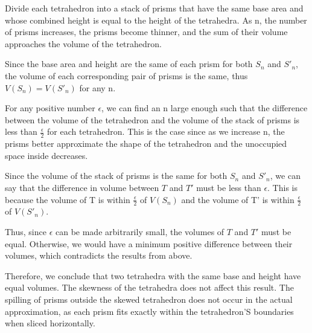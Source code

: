 \documentclass{article}
\begin{document}
Divide each tetrahedron into a stack of prisms that have the same base area
and whose combined height is equal to the height of the tetrahedra.
As n, the number of prisms increases, the prisms become thinner, and the sum
of their volume approaches the volume of the tetrahedron.

Since the base area and height are the same of each prism for both $S_n$
and ${S'}_n$, the volume of each corresponding pair of prisms is the same,
thus $V(S_n) = V({S'}_n)$ for any n.

For any positive number $\epsilon$, we can find an n large enough such that
the difference between the volume of the tetrahedron and the volume of the stack
of prisms is less than $\frac{\epsilon}{2}$ for each tetrahedron. This is the case
since as we increase n, the prisms better approximate the shape of the tetrahedron
and the unoccupied space inside decreases.

Since the volume of the stack of prisms is the same for both $S_n$ and ${S'}_n$,
we can say that the difference in volume between $T$ and $T'$ must be less than
$\epsilon$. This is because the volume of T is within $\frac{\epsilon}{2}$
of $V(S_n)$ and the volume of T' is within $\frac{\epsilon}{2}$ of $V({S'}_n)$.

Thus, since $\epsilon$ can be made arbitrarily small, the volumes of $T$
and $T'$ must be equal. Otherwise, we would have a minimum
positive difference between their volumes, which contradicts the results
from above.

Therefore, we conclude that two tetrahedra with the same base and height have
equal volumes. The skewness of the tetrahedra does not affect this result.
The spilling of prisms outside the skewed tetrahedron does not occur
in the actual approximation, as each prism fits exactly within the tetrahedron'S
boundaries when sliced horizontally.
\end{document}
